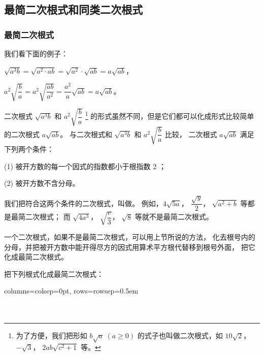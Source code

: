 \subsection{最简二次根式和同类二次根式}\label{subsec:10-3}
\begin{enhancedline}

\subsubsection{最简二次根式}

我们看下面的例子：

$\sqrt{a^3b} = \sqrt{a^2 \cdot ab} = \sqrt{a^2} \cdot \sqrt{ab} = a\sqrt{ab}$，

$a^2\sqrt{\dfrac{b}{a}} = a^2 \sqrt{\dfrac{ab}{a^2}} = \dfrac{a^2}{a}\sqrt{ab} = a\sqrt{ab}$。

二次根式 $\sqrt{a^3b}$ 和 $a^2\sqrt{\dfrac{b}{a}}$ \footnote{为了方便，我们把形如 $b\sqrt{a} \; (a \geqslant0)$
    的式子也叫做二次根式，如 $10\sqrt{2}$， $-\sqrt{3}$， $2ab\sqrt{c^2 +1}$ 等。
}
的形式虽然不同，但是它们都可以化成形式比较简单的二次根式 $a\sqrt{ab}$。
与二次根式和  $\sqrt{a^3b}$ 和 $a^2\sqrt{\dfrac{b}{a}}$ 比较，
二次根式 $a\sqrt{ab}$ 满足下列两个条件：

(1) 被开方数的每一个因式的指数都小于根指数 $2$ ；

(2) 被开方数不含分母。

我们把符合这两个条件的二次根式，叫做。
例如，$4\sqrt{5a}$， $\dfrac{\sqrt{y}}{2}$， $\sqrt{a^2 + b}$ 等都是最简二次根式；
而 $\sqrt{4a^3}$， $\sqrt{\dfrac{c}{3}}$， $\sqrt{8}$ 等就不是最简二次根式。

一个二次根式，如果不是最简二次根式，可以用上节所说的方法，
化去根号内的分母，并把被开方数中能开得尽方的因式用算术平方根代替移到根号外面，
把它化成最简二次根式。

\liti[0] 把下列根式化成最简二次根式：
\begin{xiaoxiaotis}

    \hspace*{1.5em} 

\resetxxt
\jie \begin{tblr}[t]{columns={colsep=0pt}, rows={rowsep=0.5em}}
     \\
     \\
     \\
\end{tblr}


\end{xiaoxiaotis}
\end{enhancedline}
